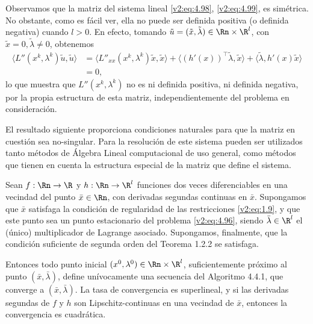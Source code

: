 Observamos que la matriz del sistema lineal \eqref{v2:eq:4.98}, \eqref{v2:eq:4.99}, es simétrica. No obstante, como es fácil ver, ella no puede ser definida positiva (o definida negativa) cuando $l > 0$. En efecto, tomando $\tilde{u} = (\tilde{x}, \tilde{\lambda}) \in \Rn \times \R^l$, con $\tilde{x} = 0, \tilde{\lambda} \neq 0$, obtenemos
\begin{align*}
    \langle L''(x^k, \lambda^k) \tilde{u}, \tilde{u} \rangle &= \langle L''_{xx}(x^k, \lambda^k)\tilde{x}, \tilde{x} \rangle + \langle (h'(x))^\top \tilde{\lambda}, \tilde{x} \rangle + \langle \tilde{\lambda}, h'(x)\tilde{x} \rangle \\
    &= 0,
\end{align*}
lo que muestra que $L''(x^k, \lambda^k)$ no es ni definida positiva, ni definida negativa, por la propia estructura de esta matriz, independientemente del problema en consideración.

El resultado siguiente proporciona condiciones naturales para que la matriz en cuestión sea no-singular. Para la resolución de este sistema pueden ser utilizados tanto métodos de Álgebra Lineal computacional de uso general, como métodos que tienen en cuenta la estructura especial de la matriz que define el sistema.

\begin{theorem}\label{v2:thm:4.4.1}
    Sean $f: \Rn \to \R$ y $h: \Rn \to \R^l$ funciones dos veces diferenciables en una vecindad del punto $\bar{x} \in \Rn$, con derivadas segundas continuas en $\bar{x}$. Supongamos que $\bar{x}$ satisfaga la condición de regularidad de las restricciones \eqref{v2:eq:1.9}, y que este punto sea un punto estacionario del problema \eqref{v2:eq:4.96}, siendo $\bar{\lambda} \in \R^l$ el (único) multiplicador de Lagrange asociado. Supongamos, finalmente, que la condición suficiente de segunda orden del Teorema 1.2.2 se satisfaga.
    
    Entonces todo punto inicial $(x^0, \lambda^0) \in \Rn \times \R^l$, suficientemente próximo al punto $(\bar{x}, \bar{\lambda})$, define unívocamente una secuencia del Algoritmo 4.4.1, que converge a $(\bar{x}, \bar{\lambda})$. La tasa de convergencia es superlineal, y si las derivadas segundas de $f$ y $h$ son Lipschitz-continuas en una vecindad de $\bar{x}$, entonces la convergencia es cuadrática.
\end{theorem}

